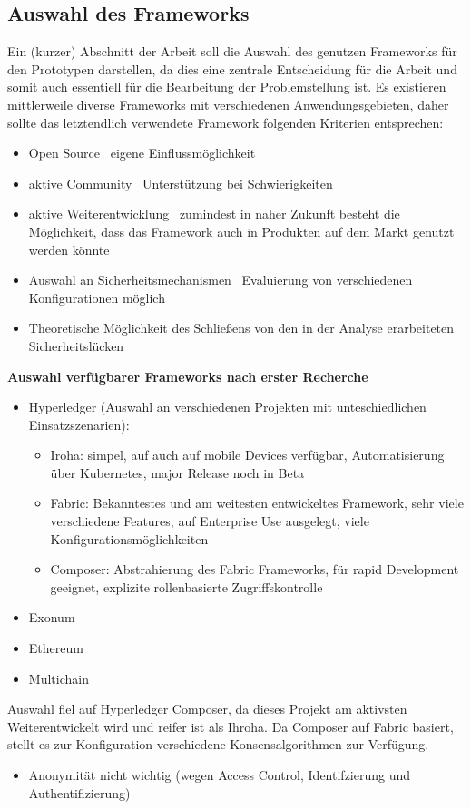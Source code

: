 \subsection{Auswahl des Frameworks}
\label{sec:prototype_framework}
    Ein (kurzer) Abschnitt der Arbeit soll die Auswahl des genutzen Frameworks für den Prototypen darstellen, da dies eine zentrale Entscheidung für die Arbeit und somit auch essentiell für die Bearbeitung der Problemstellung ist.
    Es existieren mittlerweile diverse Frameworks mit verschiedenen Anwendungsgebieten, daher sollte das letztendlich verwendete Framework folgenden Kriterien entsprechen:
    \begin{itemize}[noitemsep]
        \item Open Source \textrightarrow\ eigene Einflussmöglichkeit
        \item aktive Community \textrightarrow\ Unterstützung bei Schwierigkeiten
        \item aktive Weiterentwicklung \textrightarrow\ zumindest in naher Zukunft besteht die Möglichkeit, dass das Framework auch in Produkten auf dem Markt genutzt werden könnte
        \item Auswahl an Sicherheitsmechanismen \textrightarrow\ Evaluierung von verschiedenen Konfigurationen möglich
        \item Theoretische Möglichkeit des Schließens von den in der Analyse erarbeiteten Sicherheitslücken
    \end{itemize}
    \medskip
    \textbf{Auswahl verfügbarer Frameworks nach erster Recherche}
    \begin{itemize}[noitemsep]
        \item Hyperledger (Auswahl an verschiedenen Projekten mit unteschiedlichen Einsatzszenarien):\\
            \begin{itemize}[noitemsep]
                \item Iroha: simpel, auf auch auf mobile Devices verfügbar, Automatisierung über Kubernetes, major Release noch in Beta
                \item Fabric: Bekanntestes und am weitesten entwickeltes Framework, sehr viele verschiedene Features, auf Enterprise Use ausgelegt, viele Konfigurationsmöglichkeiten
                \item Composer: Abstrahierung des Fabric Frameworks, für rapid Development geeignet, explizite rollenbasierte Zugriffskontrolle
            \end{itemize}
        \item Exonum
        \item Ethereum
        \item Multichain
    \end{itemize}
    Auswahl fiel auf Hyperledger Composer, da dieses Projekt am aktivsten Weiterentwickelt wird und reifer ist als Ihroha.
    Da Composer auf Fabric basiert, stellt es zur Konfiguration verschiedene Konsensalgorithmen zur Verfügung.
    
    \begin{itemize}[noitemsep]
        \item Anonymität nicht wichtig (wegen Access Control, Identifzierung und Authentifizierung)
    \end{itemize}

